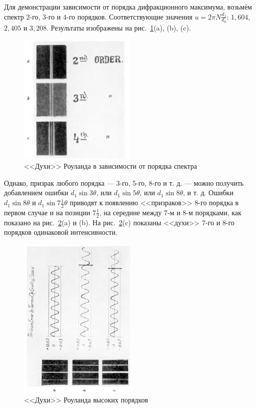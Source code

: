 \documentclass[a4paper, 12pt]{article}
\begin{document}
Для демонстрации зависимости от порядка дифракционного максимума, возьмём спектр 2-го, 3-го и 4-го порядков. Соответствующие значения $u = 2 \pi N \frac{d_1}{d_0}$: $1,604$, $2,405$ и $3,208$. Результаты изображены на рис.~\ref{fig:orders}(a), (b), (c).

\begin{figure}[h!]
\begin{center}
    \includegraphics[width=0.5\textwidth]{orders.png}
\end{center}
\caption{<<Духи>> Роуланда в зависимости от порядка спектра}
\label{fig:orders}
\end{figure}

Однако, призрак любого порядка --- 3-го, 5-го, 8-го и т. д. --- можно получить добавлением ошибки $d_1 \sin{3\theta}$, или $d_1 \sin{5\theta}$, или $d_1 \sin{8\theta}$, и т. д. Ошибки $d_1 \sin{8\theta}$ и $d_1 \sin{7\frac{1}{2}\theta}$ приводят к появлению <<призраков>> 8-го порядка в первом случае и на позиции $7\frac{1}{2}$, на середине между 7-м и 8-м порядками, как показано на рис.~\ref{fig:periods}(a) и (b). На рис.~\ref{fig:periods}(c) показаны <<духи>> 7-го и 8-го порядков одинаковой интенсивности.

\begin{figure}[h!]
\begin{center}
    \includegraphics[width=0.51\textwidth]{periods.png}
\end{center}
\caption{<<Духи>> Роуланда высоких порядков}
\label{fig:periods}
\end{figure}
\end{document}

